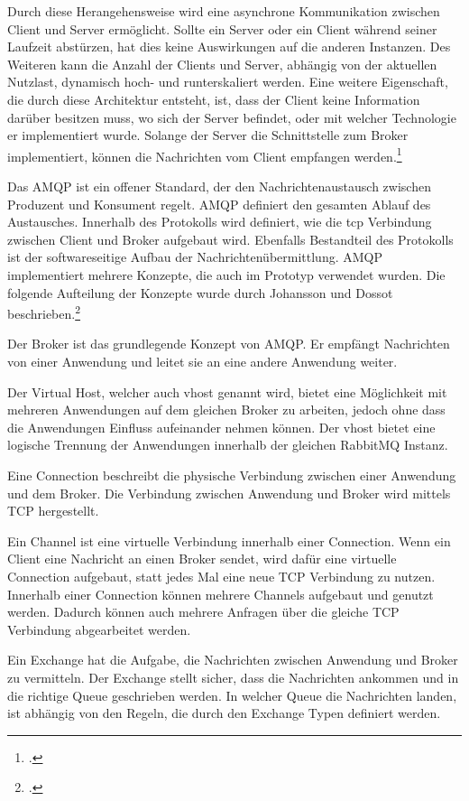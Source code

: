 Durch diese Herangehensweise wird eine asynchrone Kommunikation zwischen Client und Server ermöglicht. Sollte ein Server oder ein Client während seiner Laufzeit abstürzen, hat dies keine Auswirkungen auf die anderen Instanzen. Des Weiteren kann die Anzahl der Clients und Server, abhängig von der aktuellen Nutzlast, dynamisch hoch- und runterskaliert werden. Eine weitere Eigenschaft, die durch diese Architektur entsteht, ist, dass der Client keine Information darüber besitzen muss, wo sich der Server befindet, oder mit welcher Technologie er implementiert wurde. Solange der Server die Schnittstelle zum Broker implementiert, können die Nachrichten vom Client empfangen werden.\footcite{dossot2014rabbitmq}

Das AMQP ist ein offener Standard, der den Nachrichtenaustausch zwischen Produzent und Konsument regelt. AMQP definiert den gesamten Ablauf des Austausches. Innerhalb des Protokolls wird definiert, wie die \ac{tcp} Verbindung zwischen Client und Broker aufgebaut wird. Ebenfalls Bestandteil des Protokolls ist der softwareseitige Aufbau der Nachrichtenübermittlung. AMQP implementiert mehrere Konzepte, die auch im Prototyp verwendet wurden. Die folgende Aufteilung der Konzepte wurde durch Johansson und Dossot beschrieben.\footcite{JohanssonLovisa2020REBD}

Der Broker ist das grundlegende Konzept von AMQP. Er empfängt Nachrichten von einer Anwendung und leitet sie an eine andere Anwendung weiter.

Der Virtual Host, welcher auch vhost genannt wird, bietet eine Möglichkeit mit mehreren Anwendungen auf dem gleichen Broker zu arbeiten, jedoch ohne dass die Anwendungen Einfluss aufeinander nehmen können. Der vhost bietet eine logische Trennung der Anwendungen innerhalb der gleichen RabbitMQ Instanz.

Eine Connection beschreibt die physische Verbindung zwischen einer Anwendung und dem Broker. Die Verbindung zwischen Anwendung und Broker wird mittels TCP hergestellt. 

Ein Channel ist eine virtuelle Verbindung innerhalb einer Connection. Wenn ein Client eine Nachricht an einen Broker sendet, wird dafür eine virtuelle Connection aufgebaut, statt jedes Mal eine neue TCP Verbindung zu nutzen. Innerhalb einer Connection können mehrere Channels aufgebaut und genutzt werden. Dadurch können auch mehrere Anfragen über die gleiche TCP Verbindung abgearbeitet werden. 

Ein Exchange hat die Aufgabe, die Nachrichten zwischen Anwendung und Broker zu vermitteln. Der Exchange stellt sicher, dass die Nachrichten ankommen und in die richtige Queue geschrieben werden. In welcher Queue die Nachrichten landen, ist abhängig von den Regeln, die durch den Exchange Typen definiert werden.  

